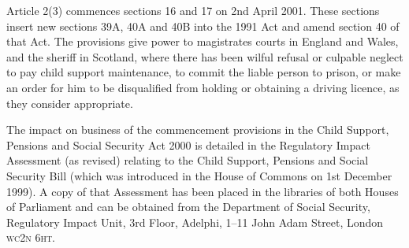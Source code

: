\documentclass[12pt,a4paper]{article}
\begin{document}
Article 2(3) commences sections 16 and 17 on 2nd April 2001. These sections insert new sections 39A, 40A and 40B into the 1991 Act and amend section 40 of that Act. The provisions give power to magistrates courts in England and Wales, and the sheriff in Scotland, where there has been wilful refusal or culpable neglect to pay child support maintenance, to commit the liable person to prison, or make an order for him to be disqualified from holding or obtaining a driving licence, as they consider appropriate.

The impact on business of the commencement provisions in the Child Support, Pensions and Social Security Act 2000 is detailed in the Regulatory Impact Assessment (as revised) relating to the Child Support, Pensions and Social Security Bill (which was introduced in the House of Commons on 1st December 1999). A copy of that Assessment has been placed in the libraries of both Houses of Parliament and can be obtained from the Department of Social Security, Regulatory Impact Unit, 3rd Floor, Adelphi, 1--11 John Adam Street, London \textsc{\lowercase{WC2N 6HT}}. 
\end{document}

